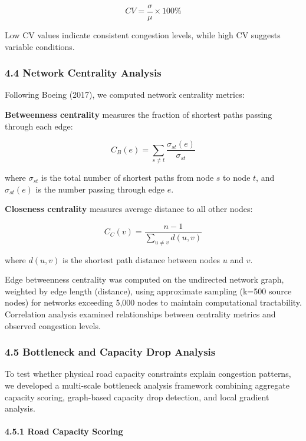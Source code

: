 \documentclass[
  12pt,
]{article}
\begin{document}
\[CV = \frac{\sigma}{\mu} \times 100\%\]

Low CV values indicate consistent congestion levels, while high CV suggests variable conditions.

\subsubsection{4.4 Network Centrality Analysis}\label{network-centrality-analysis}

Following Boeing (2017), we computed network centrality metrics:

\textbf{Betweenness centrality} measures the fraction of shortest paths passing through each edge:

\[C_B(e) = \sum_{s \neq t} \frac{\sigma_{st}(e)}{\sigma_{st}}\]

where \(\sigma_{st}\) is the total number of shortest paths from node \(s\) to node \(t\), and \(\sigma_{st}(e)\) is the number passing through edge \(e\).

\textbf{Closeness centrality} measures average distance to all other nodes:

\[C_C(v) = \frac{n-1}{\sum_{u \neq v} d(u,v)}\]

where \(d(u,v)\) is the shortest path distance between nodes \(u\) and \(v\).

Edge betweenness centrality was computed on the undirected network graph, weighted by edge length (distance), using approximate sampling (k=500 source nodes) for networks exceeding 5,000 nodes to maintain computational tractability. Correlation analysis examined relationships between centrality metrics and observed congestion levels.

\subsubsection{4.5 Bottleneck and Capacity Drop Analysis}\label{bottleneck-and-capacity-drop-analysis}

To test whether physical road capacity constraints explain congestion patterns, we developed a multi-scale bottleneck analysis framework combining aggregate capacity scoring, graph-based capacity drop detection, and local gradient analysis.

\paragraph{4.5.1 Road Capacity Scoring}\label{road-capacity-scoring}
\end{document}
